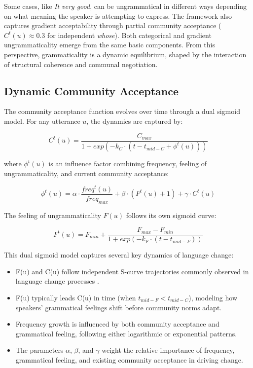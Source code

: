 \documentclass[12pt,letterpaper]{article}
\begin{document}
Some cases, like \textit{It very good}, can be ungrammatical in different ways depending on what meaning the speaker is attempting to express. The framework also captures gradient acceptability through partial community acceptance (\(C^t(u) \approx 0.3\) for independent \textit{whose}). Both categorical and gradient ungrammaticality emerge from the same basic components. From this perspective, grammaticality is a dynamic equilibrium, shaped by the interaction of structural coherence and communal negotiation.

\subsection{Dynamic Community Acceptance} 

The community acceptance function evolves over time through a dual sigmoid model. For any utterance $u$, the dynamics are captured by:

\[
C^t(u) = \frac{C_{max}}{1 + exp(-k_C \cdot (t - t_{mid-C} + \phi^t(u)))}
\]

where $\phi^t(u)$ is an influence factor combining frequency, feeling of ungrammaticality, and current community acceptance:

\[
\phi^t(u) = \alpha \cdot \frac{freq^t(u)}{freq_{max}} + \beta \cdot (F^t(u) + 1) + \gamma \cdot C^t(u)
\]

The feeling of ungrammaticality $F(u)$ follows its own sigmoid curve:

\[
F^t(u) = F_{min} + \frac{F_{max} - F_{min}}{1 + exp(-k_F \cdot (t - t_{mid-F}))}
\]

This dual sigmoid model captures several key dynamics of language change:

\begin{itemize}
    \item F(u) and C(u) follow independent S-curve trajectories commonly observed in language change processes \autocite{Blythe2012}.
    \item F(u) typically leads C(u) in time (when $t_{mid-F} < t_{mid-C}$), modeling how speakers' grammatical feelings shift before community norms adapt.
    \item Frequency growth is influenced by both community acceptance and grammatical feeling, following either logarithmic or exponential patterns.
    \item The parameters $\alpha$, $\beta$, and $\gamma$ weight the relative importance of frequency, grammatical feeling, and existing community acceptance in driving change.
\end{itemize}
\end{document}
